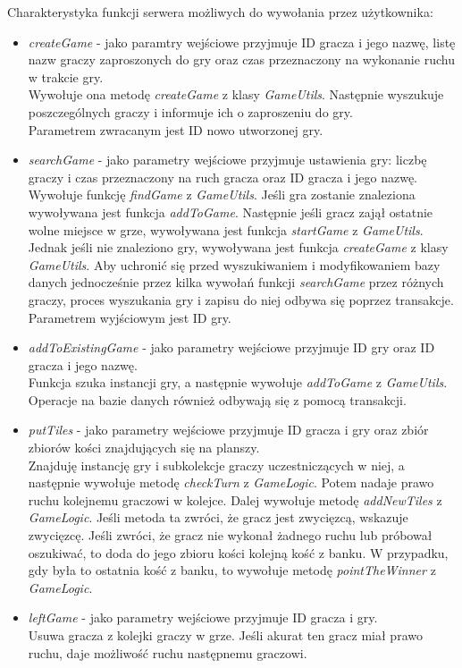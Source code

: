 Charakterystyka funkcji serwera możliwych do wywołania przez użytkownika:
\begin{itemize}
	\item \emph{createGame} - jako paramtry wejściowe przyjmuje ID gracza i jego nazwę, listę nazw graczy zaproszonych do gry oraz czas przeznaczony na wykonanie ruchu w trakcie gry. \\
	Wywołuje ona metodę \emph{createGame} z klasy \emph{GameUtils}. Następnie wyszukuje poszczególnych graczy i informuje ich o zaproszeniu do gry. \\
	Parametrem zwracanym jest ID nowo utworzonej gry.
	\item \emph{searchGame} - jako parametry wejściowe przyjmuje ustawienia gry: liczbę graczy i czas przeznaczony na ruch gracza oraz ID gracza i jego nazwę. \\ 
	Wywołuje funkcję \emph{findGame} z \emph{GameUtils}. Jeśli gra zostanie znaleziona wywoływana jest funkcja \emph{addToGame}. Następnie jeśli gracz zajął ostatnie wolne miejsce w grze, wywoływana jest funkcja \emph{startGame} z \emph{GameUtils}. Jednak jeśli nie znaleziono gry, wywoływana jest funkcja \emph{createGame} z klasy \emph{GameUtils}.	Aby uchronić się przed wyszukiwaniem i modyfikowaniem bazy danych jednocześnie przez kilka wywołań funkcji \emph{searchGame} przez różnych graczy, proces wyszukania gry i zapisu do niej odbywa się poprzez transakcje. \\
	Parametrem wyjściowym jest ID gry.
	\item \emph{addToExistingGame} - jako parametry wejściowe przyjmuje ID gry oraz ID gracza i jego nazwę. \\
	Funkcja szuka instancji gry, a następnie wywołuje \emph{addToGame} z \emph{GameUtils}. Operacje na bazie danych również odbywają się z pomocą transakcji.
	\item \emph{putTiles} - jako parametry wejściowe przyjmuje ID gracza i gry oraz zbiór zbiorów kości znajdujących się na planszy. \\
	Znajduję instancję gry i subkolekcje graczy uczestniczących w niej, a następnie wywołuje metodę \emph{checkTurn} z \emph{GameLogic}. Potem nadaje prawo ruchu kolejnemu graczowi w kolejce. Dalej wywołuje metodę \emph{addNewTiles} z \emph{GameLogic}. Jeśli metoda ta zwróci, że gracz jest zwycięzcą, wskazuje zwycięzcę. Jeśli zwróci, że gracz nie wykonał żadnego ruchu lub próbował oszukiwać, to doda do jego zbioru kości kolejną kość z banku. W przypadku, gdy była to ostatnia kość z banku, to wywołuje metodę \emph{pointTheWinner} z \emph{GameLogic}.
	\item \emph{leftGame} - jako parametry wejściowe przyjmuje ID gracza i gry. \\
	Usuwa gracza z kolejki graczy w grze. Jeśli akurat ten gracz miał prawo ruchu, daje możliwość ruchu następnemu graczowi. \\
\end{itemize}

